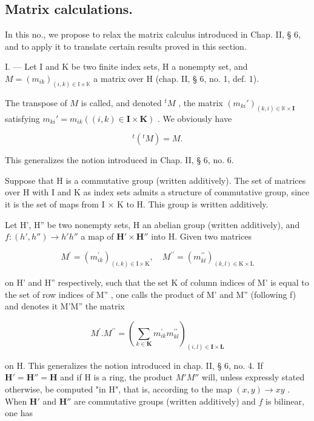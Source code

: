 \subsection{Matrix calculations.}

In this no., we propose to relax the matrix calculus introduced in Chap. II, § 6, and to apply it to translate certain results proved in this section.

I. --- Let I and K be two finite index sets, H a nonempty set, and \(M = (m_{ik})_{(i,k) \in \mathbb{I} \times \mathbb{K}}\) a matrix over H (chap. II, § 6, no. 1, def. 1).

The transpose of \(M\) is called, and denoted \({}^t M\) , the matrix \((m_{ki}')_{(k,i) \in \mathbb{K} \times \mathbf{I}}\) satisfying \(m_{ki}' = m_{ik} ((i, k) \in \mathbf{I} \times \mathbf{K})\) . We obviously have

\[
^ {t} (^ {t} M) = M.\tag{39}
\]

This generalizes the notion introduced in Chap. II, § 6, no. 6.

Suppose that H is a commutative group (written additively). The set of matrices over H with I and K as index sets admits a structure of commutative group, since it is the set of maps from I × K to H. This group is written additively.

Let H', H'' be two nonempty sets, H an abelian group (written additively), and \(f:(h',h'')\to h'h''\) a map of \(\mathbf{H}'\times\mathbf{H}''\) into H. Given two matrices

\[
M ^ {\prime} = (m _ {i k} ^ {\prime}) _ {(i, k) \in \mathrm{I} \times \mathrm{K}}, \quad M ^ {\prime \prime} = (m _ {k l} ^ {\prime \prime}) _ {(k, l) \in \mathrm{K} \times \mathrm{L}}
\]

on H' and H'' respectively, such that the set K of column indices of M' is equal to the set of row indices of M'' , one calls the product of M' and M'' (following f) and denotes it M'M'' the matrix

\[
M ^ {\prime}. M ^ {\prime \prime} = (\sum_ {k \in \mathbf {K}} m _ {i k} ^ {\prime} m _ {k l} ^ {\prime \prime}) _ {(i, l) \in \mathbf {I} \times \mathbf {L}}\tag{40}
\]

on H. This generalizes the notion introduced in chap. II, § 6, no. 4. If \(\mathbf{H}' = \mathbf{H}'' = \mathbf{H}\) and if H is a ring, the product \(M'M''\) will, unless expressly stated otherwise, be computed "in H", that is, according to the map \((x, y) \to xy\) . When \(\mathbf{H}'\) and \(\mathbf{H}''\) are commutative groups (written additively) and \(f\) is bilinear, one has

